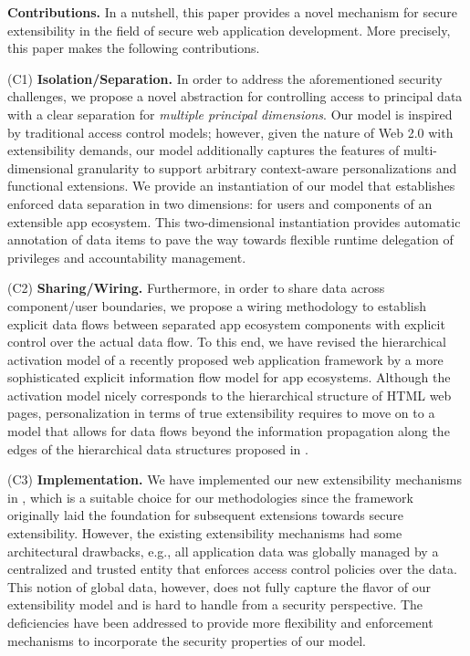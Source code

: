 \documentclass{src/acm_proc_article-sp} \else
\newcommand\myparagraph[1]{\medskip\noindent\textbf{#1.}}
\begin{document}
\myparagraph{Contributions} In a nutshell, this paper
provides a novel mechanism for secure extensibility in the
field of secure web application development. More
precisely, this paper makes the following contributions.


(C1) \textbf{Isolation/Separation.} In order to address the
aforementioned security challenges, we propose a novel
abstraction for controlling access to principal data with a
clear separation for \emph{multiple principal dimensions}.
Our model is inspired by traditional access control models;
however, given the nature of Web 2.0 with extensibility
demands, our model additionally captures the features of
multi-dimensional granularity to support arbitrary
context-aware personalizations and functional extensions. We
provide an instantiation of our model that establishes
enforced data separation in two dimensions: for users and
components of an extensible app ecosystem. This
two-dimensional instantiation provides automatic annotation
of data items to pave the way towards flexible runtime
delegation of privileges and accountability management.




(C2) \textbf{Sharing/Wiring.} Furthermore, in order to share
data across com\-po\-nent/user boundaries, we propose a
wiring methodology to establish explicit data flows between
separated app ecosystem components with explicit control
over the actual data flow. To this end, we have revised the
hierarchical activation model of a recently proposed web
application framework \cite{Reischuk12:SAFE} by a more
sophisticated explicit information flow model for app
ecosystems. Although the activation model nicely corresponds
to the hierarchical structure of HTML web pages,
personalization in terms of true extensibility requires to
move on to a model that allows for data flows beyond the
information propagation along the edges of the hierarchical
data structures proposed in \cite{Reischuk12:SAFE}.


(C3) \textbf{Implementation.} We have implemented our new
extensibility mechanisms in \cite{Reischuk12:SAFE}, which is
a suitable choice for our meth\-od\-ol\-o\-gies since the
framework originally laid the foundation for subsequent
extensions towards secure extensibility. However, the
existing extensibility mechanisms had some architectural
drawbacks, e.g., all application data was globally managed
by a centralized and trusted entity that enforces access
control policies over the data. This notion of global data,
however, does not fully capture the flavor of our
extensibility model and is hard to handle from a security
perspective. The deficiencies have been addressed to provide
more flexibility and enforcement mechanisms to incorporate
the security properties of our model.
\end{document}

